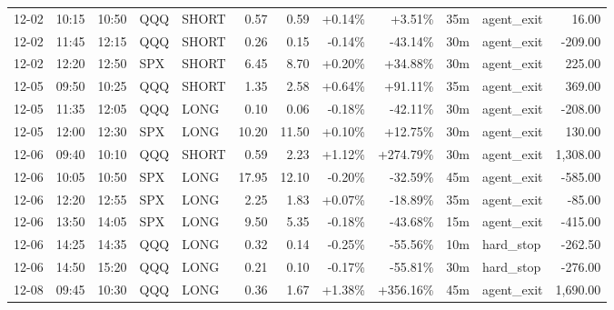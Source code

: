 \documentclass[11pt,a4paper,twoside]{article}
\begin{document}
\begin{center}
\begin{longtable}{>{\color{txtmain}}l l l l l r r r r r >{\color{txtmain}}l r}
12-02 & 10:15 & 10:50 & QQQ & SHORT & 0.57 & 0.59 & \textcolor{wingreen}{+0.14\%} & \textcolor{wingreen}{+3.51\%} & 35m & agent\_exit & \textcolor{wingreen}{16.00} \\
12-02 & 11:45 & 12:15 & QQQ & SHORT & 0.26 & 0.15 & \textcolor{lossred}{-0.14\%} & \textcolor{lossred}{-43.14\%} & 30m & agent\_exit & \textcolor{lossred}{-209.00} \\
12-02 & 12:20 & 12:50 & SPX & SHORT & 6.45 & 8.70 & \textcolor{wingreen}{+0.20\%} & \textcolor{wingreen}{+34.88\%} & 30m & agent\_exit & \textcolor{wingreen}{225.00} \\
12-05 & 09:50 & 10:25 & QQQ & SHORT & 1.35 & 2.58 & \textcolor{wingreen}{+0.64\%} & \textcolor{wingreen}{+91.11\%} & 35m & agent\_exit & \textcolor{wingreen}{369.00} \\
12-05 & 11:35 & 12:05 & QQQ & LONG & 0.10 & 0.06 & \textcolor{lossred}{-0.18\%} & \textcolor{lossred}{-42.11\%} & 30m & agent\_exit & \textcolor{lossred}{-208.00} \\
12-05 & 12:00 & 12:30 & SPX & LONG & 10.20 & 11.50 & \textcolor{wingreen}{+0.10\%} & \textcolor{wingreen}{+12.75\%} & 30m & agent\_exit & \textcolor{wingreen}{130.00} \\
12-06 & 09:40 & 10:10 & QQQ & SHORT & 0.59 & 2.23 & \textcolor{wingreen}{+1.12\%} & \textcolor{wingreen}{+274.79\%} & 30m & agent\_exit & \textcolor{wingreen}{1,308.00} \\
12-06 & 10:05 & 10:50 & SPX & LONG & 17.95 & 12.10 & \textcolor{lossred}{-0.20\%} & \textcolor{lossred}{-32.59\%} & 45m & agent\_exit & \textcolor{lossred}{-585.00} \\
12-06 & 12:20 & 12:55 & SPX & LONG & 2.25 & 1.83 & \textcolor{wingreen}{+0.07\%} & \textcolor{lossred}{-18.89\%} & 35m & agent\_exit & \textcolor{lossred}{-85.00} \\
12-06 & 13:50 & 14:05 & SPX & LONG & 9.50 & 5.35 & \textcolor{lossred}{-0.18\%} & \textcolor{lossred}{-43.68\%} & 15m & agent\_exit & \textcolor{lossred}{-415.00} \\
12-06 & 14:25 & 14:35 & QQQ & LONG & 0.32 & 0.14 & \textcolor{lossred}{-0.25\%} & \textcolor{lossred}{-55.56\%} & 10m & hard\_stop & \textcolor{lossred}{-262.50} \\
12-06 & 14:50 & 15:20 & QQQ & LONG & 0.21 & 0.10 & \textcolor{lossred}{-0.17\%} & \textcolor{lossred}{-55.81\%} & 30m & hard\_stop & \textcolor{lossred}{-276.00} \\
12-08 & 09:45 & 10:30 & QQQ & LONG & 0.36 & 1.67 & \textcolor{wingreen}{+1.38\%} & \textcolor{wingreen}{+356.16\%} & 45m & agent\_exit & \textcolor{wingreen}{1,690.00} \\

\end{longtable}
\end{center}
\end{document}

